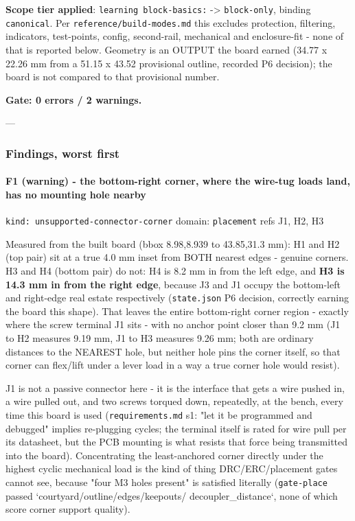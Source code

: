 \documentclass[11pt,a4paper]{article}
\begin{document}
\textbf{Scope tier applied}: \texttt{learning block-basics:} -\textgreater{} \texttt{block-only}, binding \texttt{canonical}. Per \texttt{reference/build-modes.md} this excludes protection, filtering, indicators, test-points, config, second-rail, mechanical and enclosure-fit - none of that is reported below. Geometry is an OUTPUT the board earned (34.77 x 22.26 mm from a 51.15 x 43.52 provisional outline, recorded P6 decision); the board is not compared to that provisional number.

\textbf{Gate: 0 errors / 2 warnings.}

---

\subsubsection*{Findings, worst first}
\paragraph*{F1 (warning) - the bottom-right corner, where the wire-tug loads land, has no mounting hole nearby}
\texttt{kind: unsupported-connector-corner} \textbar{} domain: \texttt{placement} \textbar{} refs J1, H2, H3

Measured from the built board (bbox 8.98,8.939 to 43.85,31.3 mm): H1 and H2 (top pair) sit at a true 4.0 mm inset from BOTH nearest edges - genuine corners. H3 and H4 (bottom pair) do not: H4 is 8.2 mm in from the left edge, and \textbf{H3 is 14.3 mm in from the right edge}, because J3 and J1 occupy the bottom-left and right-edge real estate respectively (\texttt{state.json} P6 decision, correctly earning the board this shape). That leaves the entire bottom-right corner region - exactly where the screw terminal J1 sits - with no anchor point closer than 9.2 mm (J1 to H2 measures 9.19 mm, J1 to H3 measures 9.26 mm; both are ordinary distances to the NEAREST hole, but neither hole pins the corner itself, so that corner can flex/lift under a lever load in a way a true corner hole would resist).

J1 is not a passive connector here - it is the interface that gets a wire pushed in, a wire pulled out, and two screws torqued down, repeatedly, at the bench, every time this board is used (\texttt{requirements.md} s1: "let it be programmed and debugged" implies re-plugging cycles; the terminal itself is rated for wire pull per its datasheet, but the PCB mounting is what resists that force being transmitted into the board). Concentrating the least-anchored corner directly under the highest cyclic mechanical load is the kind of thing DRC/ERC/placement gates cannot see, because "four M3 holes present" is satisfied literally (\texttt{gate-place} passed `courtyard/outline/edges/keepouts/ decoupler\_distance`, none of which score corner support quality).
\end{document}
